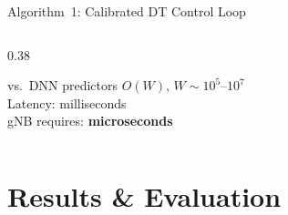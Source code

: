 \documentclass[aspectratio=169,t]{beamer}
\begin{document}
\begin{frame}{Algorithm~1: Calibrated DT Control Loop}
\begin{columns}[T]
\begin{column}{0.38\textwidth}
      \vspace{8pt}
      \begin{alertblock}{\small vs.\ DNN predictors}
        \small
        $O(W)$, $W\!\sim\!10^5$--$10^7$\\
        Latency: milliseconds\\
        gNB requires: \textbf{microseconds}
      \end{alertblock}
    \end{column}
  \end{columns}

\end{frame}

\section{Results \& Evaluation}
\end{document}
